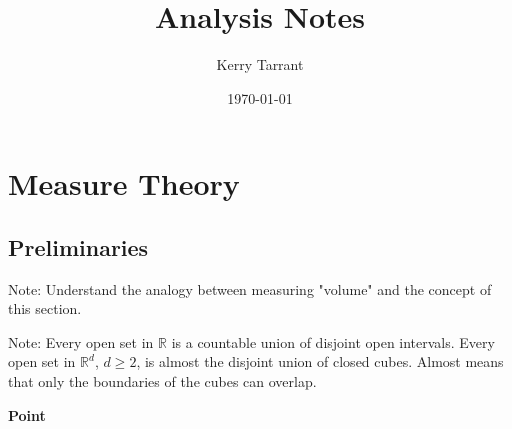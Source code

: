 \documentclass{book}
\title{Analysis Notes}
\author{Kerry Tarrant}
\date\today
\begin{document}
\maketitle
\tableofcontents{}


\chapter{Measure Theory}

\section{Preliminaries}
Note: Understand the analogy between measuring "volume" and the concept of this section.

Note: Every open set in $\mathbb{R}$ is a countable union of disjoint open intervals. Every open set in $\mathbb{R}^{d}$, $d\geq 2$, is almost the disjoint union of closed cubes. Almost means that only the boundaries of the cubes can overlap.


\textbf{Point}
\end{document}
